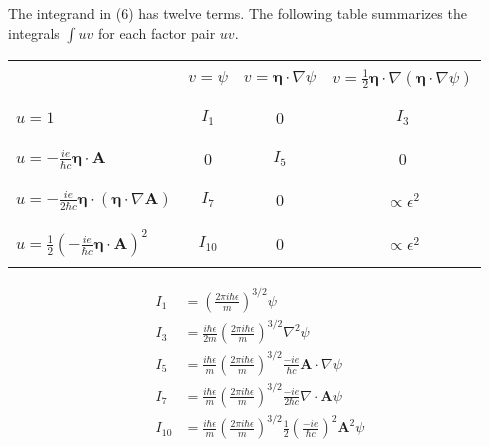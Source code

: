 \documentclass[12pt]{article}
\begin{document}
The integrand in (6) has twelve terms.
The following table summarizes the integrals $\int uv$ for each factor pair $uv$.

\begin{center}
\begin{tabular}{|l|c|c|c|}
\hline
& & & \\ %
& $v=\psi$ & $v=\boldsymbol\eta\cdot\nabla\psi$ & $v=\tfrac{1}{2}\boldsymbol\eta\cdot\nabla(\boldsymbol\eta\cdot\nabla\psi)$
\\
& & & \\ %
\hline
& & & \\ %
$u=1$ & $I_1$ & 0 & $I_3$
\\
& & & \\ %
\hline
& & &
\\
$\displaystyle u=-\frac{ie}{\hbar c}\boldsymbol\eta\cdot\mathbf A$ & 0 & $I_5$ & 0
\\
& & &
\\
\hline
& & & \\ %
$\displaystyle u=-\frac{ie}{2\hbar c}\boldsymbol\eta\cdot(\boldsymbol\eta\cdot\nabla\mathbf A)$ & $I_7$ & 0 & $\propto\epsilon^2$
\\
& & & \\ %
\hline
& & & \\ %
$\displaystyle u=\frac{1}{2}\left(-\frac{ie}{\hbar c}\boldsymbol\eta\cdot\mathbf A\right)^2$ & $I_{10}$ & 0 & $\propto\epsilon^2$
\\
& & & \\ %
\hline
\end{tabular}
\end{center}

\bigskip
\begin{align*}
I_1&=\left(\frac{2\pi i\hbar\epsilon}{m}\right)^{3/2}\psi
\\
I_3&=\frac{i\hbar\epsilon}{2m}\left(\frac{2\pi i\hbar\epsilon}{m}\right)^{3/2}\nabla^2\psi
\\
I_5&=\frac{i\hbar\epsilon}{m}\left(\frac{2\pi i\hbar\epsilon}{m}\right)^{3/2}
\frac{-ie}{\hbar c}\mathbf A\cdot\nabla\psi
\\
I_7&=\frac{i\hbar\epsilon}{m}
\left(\frac{2\pi i\hbar\epsilon}{m}\right)^{3/2}
\frac{-ie}{2\hbar c}\nabla\cdot\mathbf A\psi
\\
I_{10}&=\frac{i\hbar\epsilon}{m}
\left(\frac{2\pi i\hbar\epsilon}{m}\right)^{3/2}
\frac{1}{2}
\left(\frac{-ie}{\hbar c}\right)^2
\mathbf A^2\psi
\end{align*}
\end{document}
